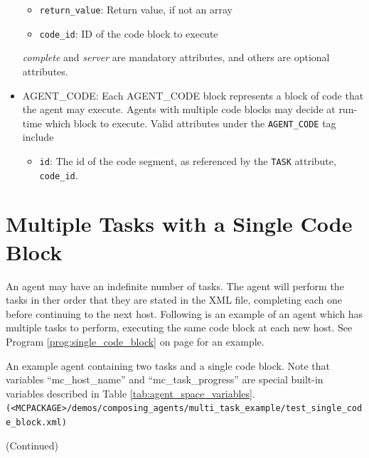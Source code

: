 \documentclass[11pt]{report}
\begin{document}
\begin{itemize}
\begin{itemize}
  \item \texttt{return\_value}: Return value, if not an array
  \item \texttt{code\_id}:      ID of the code block to execute
  \end{itemize}
\textit{complete} and \textit{server} are mandatory attributes, and others are 
optional attributes.  
\item AGENT\_CODE: Each AGENT\_CODE block represents a block of code that 
  the agent may execute. Agents with multiple code blocks may decide at run-time
  which block to execute. Valid attributes under the \texttt{AGENT\_CODE} tag
  include
  \begin{itemize}
    \item \texttt{id}: The id of the code segment, as referenced by the \texttt{TASK} 
      attribute, \texttt{code\_id}.
  \end{itemize}
\end{itemize}

\section{Multiple Tasks with a Single Code Block}
An agent may have an indefinite number of tasks. The agent will perform the tasks
in ther order that they are stated in the XML file, completing each one before
continuing to the next host. Following is an example of an agent which has
multiple tasks to perform, executing the same code block at each new host.
See Program \ref{prog:single_code_block} on page \pageref{prog:single_code_block} 
for an example.
\begin{Program}[p]
\begin{center}
   {\footnotesize \linespread{1.0} 
     }
\end{center}
\caption{An example agent containing two tasks and a single code block.
  Note that variables ``mc\_host\_name'' and ``mc\_task\_progress'' are special built-in variables described in Table \vref{tab:agent_space_variables}.
  \texttt{(<MCPACKAGE>/demos/composing\_agents/multi\_task\_example/test\_single\_code\_block.xml)} }
\label{prog:single_code_block}
\end{Program}
\addtocounter{Program}{-1}
\begin{Program}[p]
\begin{center}
   {\footnotesize \linespread{1.0} 
     }
\end{center}
\caption{(Continued)}
\end{Program}
\end{document}
